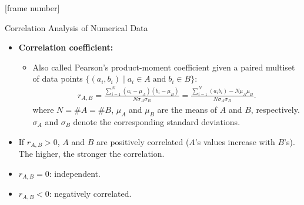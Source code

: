\documentclass[aspectratio=169,t]{beamer}
\begin{document}
  {
    [frame number]
    \begin{frame}{Correlation Analysis of Numerical Data}
    \begin{itemize}
      \item \textbf{\color{airforceblue}Correlation coefficient:}
      \begin{itemize}
        \item Also called Pearson's product-moment coefficient given a paired multiset of data points  $\{(a_i,b_i) \; \vert \; a_i \in A \; \text{and} \; b_i \in B\}$:
        \begin{align}
          r_{A,B} = \frac{\sum_{i=1}^{N} (a_i-\mu_A)(b_i-\mu_B)}{N\sigma_A\sigma_B} = \frac{\sum_{i=1}^{N}(a_ib_i)-N\mu_A\mu_B}{N \sigma_A\sigma_B}.
        \end{align}
        where $N = \#A = \#B$, $\mu_A$ and $\mu_B$ are the means of $A$ and $B$, respectively. $\sigma_A$ and $\sigma_B$ denote the corresponding standard deviations.
      \end{itemize}
      \item If $r_{A,B} > 0$, $A$ and $B$ are positively correlated ($A$'s values increase with $B$'s). \\
      The higher, the stronger the correlation.
      \item $r_{A,B} = 0$: independent.
      \item $r_{A,B} < 0$: negatively correlated.
    \end{itemize}
    \end{frame}
  }
\end{document}
